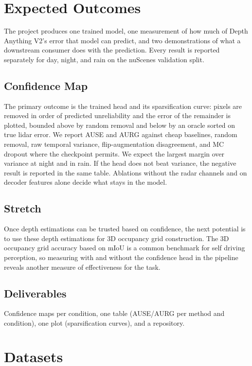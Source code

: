 \documentclass[11pt]{article}
\begin{document}
\section{Expected Outcomes}

The project produces one trained model, one measurement of how much of Depth Anything V2's error that model can predict, and two demonstrations of what a downstream consumer does with the prediction. Every result is reported separately for day, night, and rain on the nuScenes validation split.

\subsection{Confidence Map}

The primary outcome is the trained head and its sparsification curve: pixels are removed in order of predicted unreliability and the error of the remainder is plotted, bounded above by random removal and below by an oracle sorted on true lidar error. We report AUSE and AURG \citep{poggi2020uncertainty} against cheap baselines, random removal, raw temporal variance, flip-augmentation disagreement, and MC dropout where the checkpoint permits. We expect the largest margin over variance at night and in rain. If the head does not beat variance, the negative result is reported in the same table. Ablations without the radar channels and on decoder features alone decide what stays in the model.

\subsection{Stretch}

Once depth estimations can be trusted based on confidence, the next potential is to use these depth estimations for 3D occupancy grid construction. The 3D occupancy grid accuracy based on mIoU is a common benchmark for self driving perception, so measuring with and without the confidence head in the pipeline reveals another measure of effectiveness for the task.

\subsection{Deliverables}

Confidence maps per condition, one table (AUSE/AURG per method and condition), one plot (sparsification curves), and a repository.

\section{Datasets}
\end{document}
